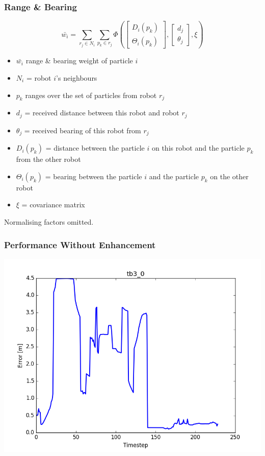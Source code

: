 \documentclass{beamer}
\begin{document}
	\begin{frame}
		\frametitle{Range \& Bearing}
		\[
		\bar{w_i} = \sum_{r_j \in N_i}\sum_{p_k \in r_j}\Phi\left(
		\begin{bmatrix}
		D_i(p_k)\\
		\Theta_i(p_k)
		\end{bmatrix},
		\begin{bmatrix}
		d_j\\
		\theta_j
		\end{bmatrix},
		\xi
		\right)
		\]
		\begin{itemize}
			\item $\bar{w_i}$ range \& bearing weight of particle $i$
			\item $N_i$ = robot $i$'s neighbours
			\item $p_k$ ranges over the set of particles from robot $r_j$ \item $d_j$ = received distance between this robot and robot $r_j$
			\item $\theta_j$ = received bearing of this robot from $r_j$
			\item $D_i(p_k)$  = distance between the particle $i$ on this robot and the particle $p_k$ from the other robot
			\item $\Theta_i(p_k)$ = bearing between the particle $i$ and the particle $p_k$ on the other robot
			\item $\xi$ = covariance matrix
		\end{itemize}
		Normalising factors omitted.
	\end{frame}	
	\begin{frame}
		\frametitle{Performance Without Enhancement}
		\includegraphics[width=\columnwidth]{figure_l2.png}
	\end{frame}
\end{document}
